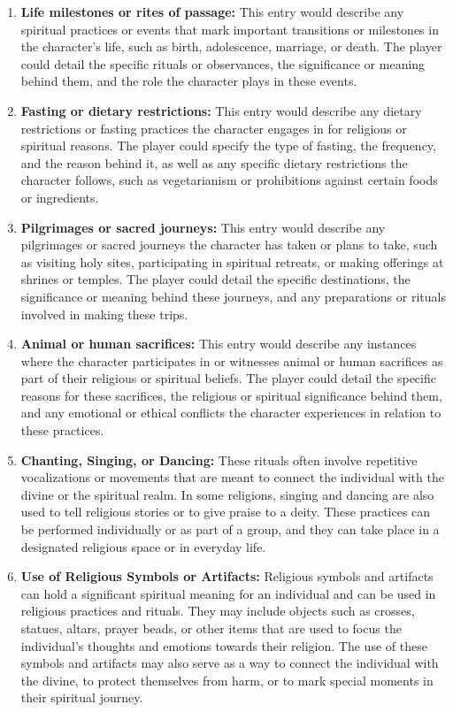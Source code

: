 \documentclass[12pt]{book}  %
\begin{document}
\begin{enumerate}
    \item \textbf{Life milestones or rites of passage:}
    This entry would describe any spiritual practices or events that mark important transitions or milestones in the character's life, such as birth, adolescence, marriage, or death. The player could detail the specific rituals or observances, the significance or meaning behind them, and the role the character plays in these events.

    \item \textbf{Fasting or dietary restrictions:}
    This entry would describe any dietary restrictions or fasting practices the character engages in for religious or spiritual reasons. The player could specify the type of fasting, the frequency, and the reason behind it, as well as any specific dietary restrictions the character follows, such as vegetarianism or prohibitions against certain foods or ingredients.
    
    \item \textbf{Pilgrimages or sacred journeys:}
    This entry would describe any pilgrimages or sacred journeys the character has taken or plans to take, such as visiting holy sites, participating in spiritual retreats, or making offerings at shrines or temples. The player could detail the specific destinations, the significance or meaning behind these journeys, and any preparations or rituals involved in making these trips.

    \item \textbf{Animal or human sacrifices:}
    This entry would describe any instances where the character participates in or witnesses animal or human sacrifices as part of their religious or spiritual beliefs. The player could detail the specific reasons for these sacrifices, the religious or spiritual significance behind them, and any emotional or ethical conflicts the character experiences in relation to these practices.

    \item \textbf{Chanting, Singing, or Dancing:}
    These rituals often involve repetitive vocalizations or movements that are meant to connect the individual with the divine or the spiritual realm. In some religions, singing and dancing are also used to tell religious stories or to give praise to a deity. These practices can be performed individually or as part of a group, and they can take place in a designated religious space or in everyday life.

    \item \textbf{Use of Religious Symbols or Artifacts:}
    Religious symbols and artifacts can hold a significant spiritual meaning for an individual and can be used in religious practices and rituals. They may include objects such as crosses, statues, altars, prayer beads, or other items that are used to focus the individual's thoughts and emotions towards their religion. The use of these symbols and artifacts may also serve as a way to connect the individual with the divine, to protect themselves from harm, or to mark special moments in their spiritual journey.
    

\end{enumerate}
\end{document}
